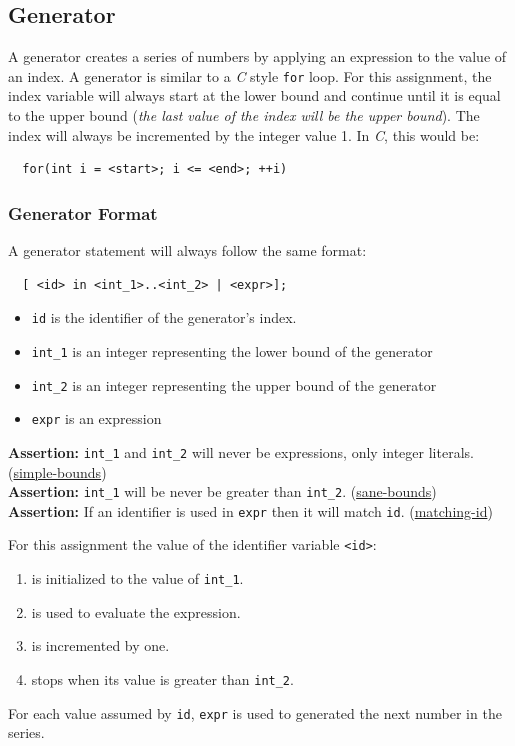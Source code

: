 \documentclass{article}
\newcommand{\code}[1]{\texttt{\textmd{#1}}}
\newcommand{\assertion}[2]{\textbf{Assertion: }#1 (\hyperlink{#2}{#2})}
\begin{document}
\subsection{Generator}
A generator creates a series of numbers by applying an expression to the value of an index. A
generator is similar to a \textit{C} style \code{for} loop. For this assignment, the index variable
will always start at the lower bound and continue until it is equal to the upper bound (\textit{the
last value of the index will be the upper bound}). The index will always be incremented by the
integer value 1. In \textit{C}, this would be:
\begin{lstlisting}
  for(int i = <start>; i <= <end>; ++i)
\end{lstlisting}

\subsubsection{Generator Format}
A generator statement will always follow the same format:
\begin{lstlisting}
  [ <id> in <int_1>..<int_2> | <expr>];
\end{lstlisting}

\begin{itemize}
  \item \code{id} is the identifier of the generator's index.
  \item \code{int\_1} is an integer representing the lower bound of the generator
  \item \code{int\_2} is an integer representing the upper bound of the generator
  \item \code{expr} is an expression
\end{itemize}

\assertion{\code{int\_1} and \code{int\_2} will never be expressions, only integer literals.}
{simple-bounds} \\
\assertion{\code{int\_1} will be never be greater than \code{int\_2}.}{sane-bounds}\\
\assertion{If an identifier is used in \code{expr} then it will match \code{id}.}{matching-id}

For this assignment the value of the identifier variable \code{<id>}:
\begin{enumerate}
  \item is initialized to the value of \code{int\_1}.
  \item is used to evaluate the expression.
  \item is incremented by one.
  \item stops when its value is greater than \code{int\_2}.
\end{enumerate}
For each value assumed by \code{id}, \code{expr} is used to generated the next number in the
series.
\end{document}
